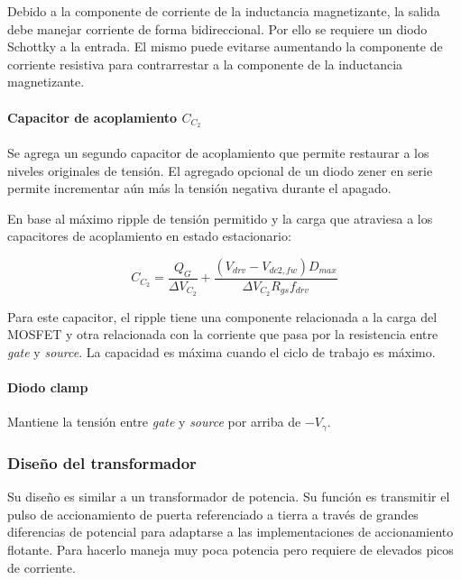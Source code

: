 Debido a la componente de corriente de la inductancia magnetizante, la salida debe manejar corriente de forma bidireccional. 
Por ello se requiere un diodo Schottky a la entrada. 
El mismo puede evitarse aumentando la componente de corriente resistiva para contrarrestar a la componente de la inductancia magnetizante. 

\paragraph{Capacitor de acoplamiento $C_{C_2}$}

Se agrega un segundo capacitor de acoplamiento que permite restaurar a los niveles originales de tensión. 
El agregado opcional de un diodo zener en serie permite incrementar aún más la tensión negativa durante el apagado. 

En base al máximo ripple de tensión permitido y la carga que atraviesa a los capacitores de acoplamiento en estado estacionario:

$$ C_{C_2}=\frac{Q_G}{\Delta V_{C_2}}+\frac{(V_{drv}-V_{dc2,fw})D_{max}}{\Delta V_{C_2}R_{gs}f_{drv}} $$

Para este capacitor, el ripple tiene una componente relacionada a la carga del MOSFET 
y otra relacionada con la corriente que pasa por la resistencia entre \textit{gate} y \textit{source}. 
La capacidad es máxima cuando el ciclo de trabajo es máximo. 

\paragraph{Diodo clamp}

Mantiene la tensión entre \textit{gate} y \textit{source} por arriba de $-V_\gamma$.\\

\subsubsection{Diseño del transformador}

Su diseño es similar a un transformador de potencia. 
Su función es transmitir el pulso de accionamiento de puerta referenciado a tierra a través de grandes diferencias de potencial para adaptarse a las implementaciones de accionamiento flotante. Para hacerlo maneja muy poca potencia pero requiere de elevados picos de corriente. 

